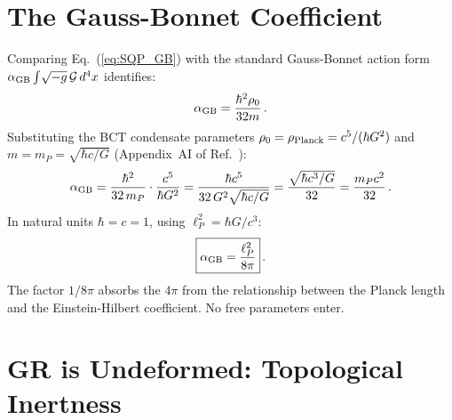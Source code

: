 \documentclass[twocolumn,10pt,a4paper]{article}
\begin{document}
\section*{The Gauss-Bonnet Coefficient}

Comparing Eq.~(\ref{eq:SQP_GB}) with the standard Gauss-Bonnet action
form $\alpha_{\rm GB}\int\!\sqrt{-g}\,\mathcal{G}\,d^4x$ identifies:
\begin{equation}
  \alpha_{\rm GB} = \frac{\hbar^2\rho_0}{32m}\,.
  \label{eq:alphaGB_general}
\end{equation}
Substituting the BCT condensate parameters
$\rho_0 = \rho_{\rm Planck} = c^5/(\hbar G^2)$ and $m = m_P =
\sqrt{\hbar c/G}$ (Appendix~AI of Ref.~\cite{monograph}):
\begin{equation}
  \alpha_{\rm GB}
  = \frac{\hbar^2}{32\,m_P} \cdot \frac{c^5}{\hbar G^2}
  = \frac{\hbar c^5}{32\,G^2\sqrt{\hbar c/G}}
  = \frac{\sqrt{\hbar c^3/G}}{32}
  = \frac{m_P c^2}{32}\,.
  \label{eq:alphaGB_calc}
\end{equation}
In natural units $\hbar = c = 1$, using $\ell_P^2 = \hbar G/c^3$:
\begin{equation}
  \boxed{\alpha_{\rm GB} = \frac{\ell_P^2}{8\pi}}\,.
  \label{eq:alphaGB_final}
\end{equation}
The factor $1/8\pi$ absorbs the $4\pi$ from the
relationship between the Planck length and the Einstein-Hilbert
coefficient. No free parameters enter.

\section*{GR is Undeformed: Topological Inertness}
\end{document}
